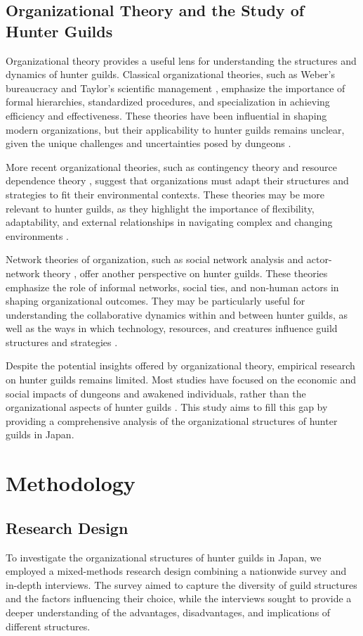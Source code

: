 \documentclass[12pt, a4paper]{article}
\begin{document}
\subsection{Organizational Theory and the Study of Hunter Guilds}
Organizational theory provides a useful lens for understanding the structures and dynamics of hunter guilds. Classical organizational theories, such as Weber's bureaucracy \cite{Weber1947} and Taylor's scientific management \cite{Taylor1911}, emphasize the importance of formal hierarchies, standardized procedures, and specialization in achieving efficiency and effectiveness. These theories have been influential in shaping modern organizations, but their applicability to hunter guilds remains unclear, given the unique challenges and uncertainties posed by dungeons \cite{Takahashi2026}.

More recent organizational theories, such as contingency theory \cite{Lawrence1967} and resource dependence theory \cite{Pfeffer1978}, suggest that organizations must adapt their structures and strategies to fit their environmental contexts. These theories may be more relevant to hunter guilds, as they highlight the importance of flexibility, adaptability, and external relationships in navigating complex and changing environments \cite{Watanabe2026a}.

Network theories of organization, such as social network analysis \cite{Borgatti2009} and actor-network theory \cite{Latour2005}, offer another perspective on hunter guilds. These theories emphasize the role of informal networks, social ties, and non-human actors in shaping organizational outcomes. They may be particularly useful for understanding the collaborative dynamics within and between hunter guilds, as well as the ways in which technology, resources, and creatures influence guild structures and strategies \cite{Sato2026}.

Despite the potential insights offered by organizational theory, empirical research on hunter guilds remains limited. Most studies have focused on the economic and social impacts of dungeons and awakened individuals, rather than the organizational aspects of hunter guilds \cite{Mori2026, Yoshida2025}. This study aims to fill this gap by providing a comprehensive analysis of the organizational structures of hunter guilds in Japan.

\section{Methodology}
\subsection{Research Design}
To investigate the organizational structures of hunter guilds in Japan, we employed a mixed-methods research design combining a nationwide survey and in-depth interviews. The survey aimed to capture the diversity of guild structures and the factors influencing their choice, while the interviews sought to provide a deeper understanding of the advantages, disadvantages, and implications of different structures.
\end{document}

